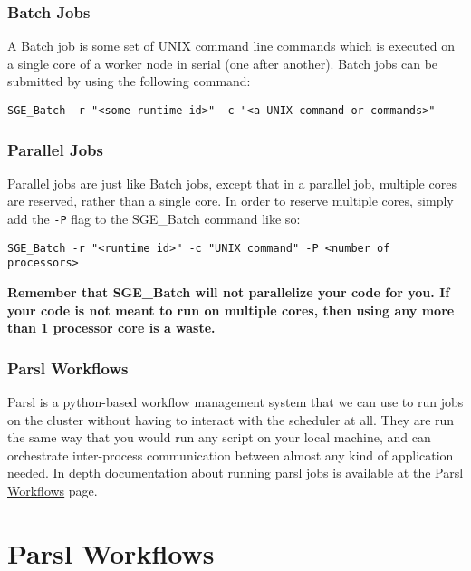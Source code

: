 \documentclass[]{book}
\theoremstyle{definition}
\theoremstyle{definition}
\theoremstyle{definition}
\theoremstyle{remark}
\begin{document}
\subsection{Batch Jobs}\label{batch-jobs}

A Batch job is some set of UNIX command line commands which is executed
on a single core of a worker node in serial (one after another). Batch
jobs can be submitted by using the following command:

\begin{verbatim}
SGE_Batch -r "<some runtime id>" -c "<a UNIX command or commands>"
\end{verbatim}

\subsection{Parallel Jobs}\label{parallel-jobs}

Parallel jobs are just like Batch jobs, except that in a parallel job,
multiple cores are reserved, rather than a single core. In order to
reserve multiple cores, simply add the \texttt{-P} flag to the
SGE\_Batch command like so:

\begin{verbatim}
SGE_Batch -r "<runtime id>" -c "UNIX command" -P <number of processors>
\end{verbatim}

\textbf{Remember that SGE\_Batch will not parallelize your code for you.
If your code is not meant to run on multiple cores, then using any more
than 1 processor core is a waste.}

\subsection{Parsl Workflows}\label{parsl-workflows}

Parsl is a python-based workflow management system that we can use to
run jobs on the cluster without having to interact with the scheduler at
all. They are run the same way that you would run any script on your
local machine, and can orchestrate inter-process communication between
almost any kind of application needed. In depth documentation about
running parsl jobs is available at the \href{link}{Parsl Workflows}
page.

\chapter{Parsl Workflows}\label{parsl-workflows-1}
\end{document}
